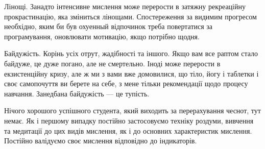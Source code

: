 Лінощі. Занадто інтенсивне мислення може перерости в затяжну
рекреаційну прокрастинацію, яка зміниться лінощами.
Спостереження за видимим прогресом необхідно, яким би був
охуенный відпочинок треба повертатися за програмування,
оновлювати мотивацію, якщо потрібно щодня.

Байдужість. Корінь усіх отрут, жадібності та іншого. Якщо
вам все раптом стало байдуже, це дуже погано, але не смертельно.
Іноді може перерости в екзистенційну кризу, але ж ми з вами вже
домовилися, що тіло, йогу і таблетки і своє самопочуття ви
берете на себе, з мене тільки рекомендації щодо процесу
навчання. Занедбана байдужість --- це тупість.

Нічого хорошого успішного студента, який виходить за
перерахування чеснот, тут немає. Як і першому випадку
постійно застосовуємо техніку роздуми, вивчення та
медитації до цих видів мислення, як і до основних характеристик
мислення. Постійно валідуємо своє мислення відповідно
до індикаторів.

\normalsize
